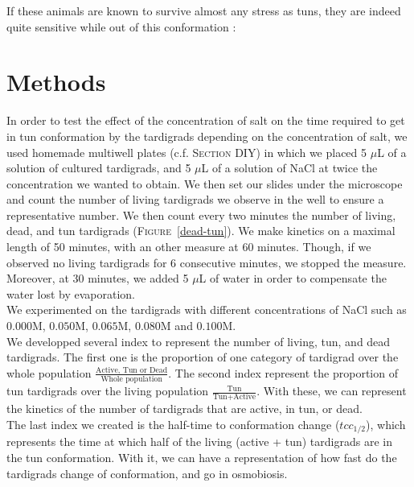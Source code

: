 \documentclass[12pt,a4paper, twocolumn]{article}
\begin{document}
If these animals are known to survive almost any stress as tuns, they are indeed quite sensitive while out of this conformation :


\section{Methods}
In order to test the effect of the concentration of salt on the time required to get in tun conformation by the tardigrads depending on the concentration of salt, we used homemade multiwell plates (c.f. \textsc{Section} DIY) in which we placed 5 $\mu$L of a solution of cultured tardigrads, and 5 $\mu$L of a solution of NaCl at twice the concentration we wanted to obtain. We then set our slides under the microscope and count the number of living tardigrads we observe in the well to ensure a representative number. We then count every two minutes the number of living, dead, and tun tardigrads (\textsc{Figure}~\ref{dead-tun}). We make kinetics on a maximal length of 50 minutes, with an other measure at 60 minutes. Though, if we observed no living tardigrads for 6 consecutive minutes, we stopped the measure. Moreover, at 30 minutes, we added 5 $\mu$L of water in order to compensate the water lost by evaporation.\\
We experimented on the tardigrads with different concentrations of NaCl such as $0.000$M, $0.050$M, $0.065$M, $0.080$M and $0.100$M.\\
We developped several index to represent the number of living, tun, and dead tardigrads. The first one is the proportion of one category of tardigrad over the whole population $\frac{\text{Active, Tun or Dead}}{\text{Whole population}}$. The second index represent the proportion of tun tardigrads over the living population $\frac{\text{Tun}}{\text{Tun}+ \text{Active}}$. With these, we can represent the kinetics of the number of tardigrads that are active, in tun, or dead.\\
The last index we created is the half-time to conformation change ($tcc_{1/2}$), which represents the time at which half of the living (active + tun) tardigrads are in the tun conformation. With it, we can have a representation of how fast do the tardigrads change of conformation, and go in osmobiosis.
\end{document}
